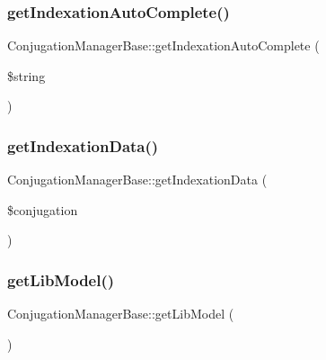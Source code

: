 \hypertarget{class_conjugation_manager_base_a8686180500ee969d111c7764d52a1725}{}\label{class_conjugation_manager_base_a8686180500ee969d111c7764d52a1725} 
\subsubsection{\texorpdfstring{get\+Indexation\+Auto\+Complete()}{getIndexationAutoComplete()}}
{\footnotesize\ttfamily Conjugation\+Manager\+Base\+::get\+Indexation\+Auto\+Complete (\begin{DoxyParamCaption}\item[{}]{\$string }\end{DoxyParamCaption})}

\hypertarget{class_conjugation_manager_base_a51e5b1141591ac39b9b92a46411b688c}{}\label{class_conjugation_manager_base_a51e5b1141591ac39b9b92a46411b688c} 
\subsubsection{\texorpdfstring{get\+Indexation\+Data()}{getIndexationData()}}
{\footnotesize\ttfamily Conjugation\+Manager\+Base\+::get\+Indexation\+Data (\begin{DoxyParamCaption}\item[{}]{\$conjugation }\end{DoxyParamCaption})}

\hypertarget{class_conjugation_manager_base_a408ff3238b71c5e124eb4226a6a92792}{}\label{class_conjugation_manager_base_a408ff3238b71c5e124eb4226a6a92792} 
\subsubsection{\texorpdfstring{get\+Lib\+Model()}{getLibModel()}}
{\footnotesize\ttfamily Conjugation\+Manager\+Base\+::get\+Lib\+Model (\begin{DoxyParamCaption}{ }\end{DoxyParamCaption})}

